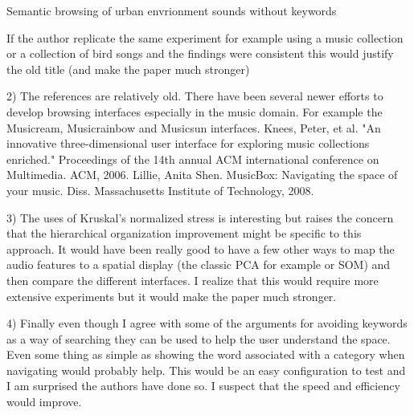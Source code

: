 \documentclass[10pt]{article}
\begin{document}
Semantic browsing of urban envrionment sounds without keywords 

If the author replicate the same experiment for example using a music collection or a collection of bird songs and the findings were consistent 
this would justify the old title (and make the paper much stronger) 

2) The references are relatively old. There have been several newer efforts to develop browsing interfaces especially in the music domain. 
For example the Musicream, Musicrainbow and Musicsun interfaces. 
Knees, Peter, et al. "An innovative three-dimensional user interface for exploring music collections enriched." Proceedings of the 14th annual ACM international conference on Multimedia. ACM, 2006.
Lillie, Anita Shen. MusicBox: Navigating the space of your music. Diss. Massachusetts Institute of Technology, 2008.

3) The uses of Kruskal's normalized stress is interesting but raises the concern that the hierarchical organization improvement might be specific to this approach. It would have been 
really good to have a few other ways to map the audio features to a spatial display (the classic PCA for example or SOM) and then compare the different interfaces. I realize that 
this would require more extensive experiments but it would make the paper much stronger. 

4) Finally even though I agree with some of the arguments for avoiding keywords as a way of searching they can be used to help the user understand the space. Even some thing 
as simple as showing the word associated with a category when navigating would probably help. This would be an easy configuration to test and I am surprised the authors 
have done so. I suspect that the speed and efficiency would improve.
\end{document}
